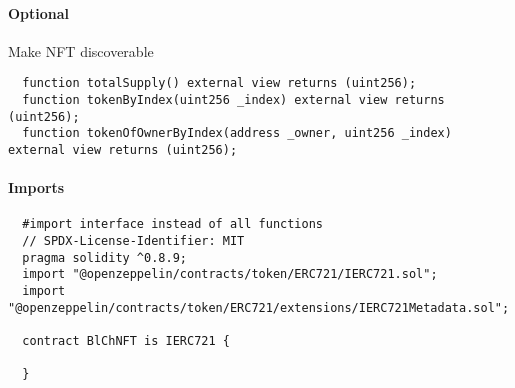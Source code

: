 \paragraph{Optional}
Make NFT discoverable
\begin{lstlisting}
  function totalSupply() external view returns (uint256);
  function tokenByIndex(uint256 _index) external view returns (uint256);
  function tokenOfOwnerByIndex(address _owner, uint256 _index) external view returns (uint256);
\end{lstlisting}

\paragraph{Imports}
\begin{lstlisting}
  #import interface instead of all functions
  // SPDX-License-Identifier: MIT
  pragma solidity ^0.8.9;
  import "@openzeppelin/contracts/token/ERC721/IERC721.sol";
  import "@openzeppelin/contracts/token/ERC721/extensions/IERC721Metadata.sol";

  contract BlChNFT is IERC721 {
    
  }
\end{lstlisting}